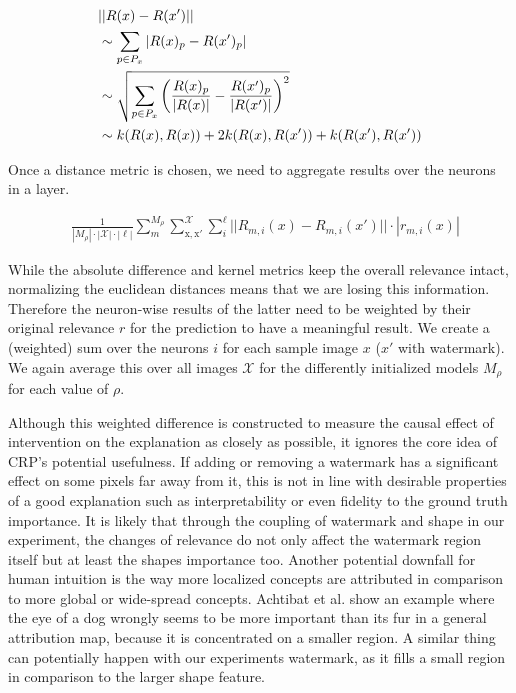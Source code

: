 \begin{align}
& ||R(x) - R(x')|| \notag \\
& \sim \sum_{p \in P_x} |R(x)_p - R(x')_p| \\
& \sim \sqrt{\sum_{p \in P_x}\left( \frac{R(x)_p}{|R(x)|} - \frac{R(x')_p}{|R(x')|} \right) ^2} \\
& \sim k(R(x) ,R(x) ) + 2 k(R(x) ,R(x') ) + k(R(x') ,R(x') )  
\end{align}

Once a distance metric is chosen, we need to aggregate results over the neurons in a layer.

\begin{align}
& \frac{1}{|M_\rho|\cdot |\mathcal{X}| \cdot |\ell| }\sum_{m}^{M_{\rho}} \sum_{\mathrm{x,x'}}^{\mathcal{X}} \sum_{i}^{\ell} || R_{m,i}(x) - R_{m,i}(x') || \cdot |r_{m,i}(x) |
\end{align}

While the absolute difference and kernel metrics keep the overall relevance intact, normalizing the euclidean distances means that we are losing this information. Therefore the neuron-wise results of the latter need to be weighted by their original relevance $r$ for the prediction to have a meaningful result. 
We create a (weighted) sum over the neurons $i$ for each sample image $x$ ($x'$ with watermark). 
We again average this over all images $\mathcal{X}$ for the differently initialized models $M_\rho$ for each value of $\rho$.


Although this weighted difference is constructed to measure the causal effect of intervention on the explanation as closely as possible, it ignores the core idea of CRP's potential usefulness. If adding or removing a watermark has a significant effect on some pixels far away from it, this is not in line with desirable properties of a good explanation such as interpretability or even fidelity to the ground truth importance. It is likely that through the coupling of watermark and shape in our experiment, the changes of relevance do not only affect the watermark region itself but at least the shapes importance too. 
Another potential downfall for human intuition is the way more localized concepts are attributed in comparison to more global or wide-spread concepts. Achtibat et al. \cite{Achtibat2022} show an example where the eye of a dog wrongly seems to be more important than its fur in a general attribution map, because it is concentrated on a smaller region. A similar thing can potentially happen with our experiments watermark, as it fills a small region in comparison to the larger shape feature. 

